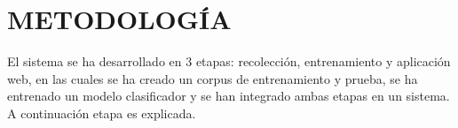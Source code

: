 \section{METODOLOGÍA}

El sistema se ha desarrollado en 3 etapas: recolección, entrenamiento y aplicación web, en las cuales se ha creado un corpus de entrenamiento y prueba, se ha entrenado un modelo clasificador y se han integrado ambas etapas en un sistema. A continuación etapa es explicada.




